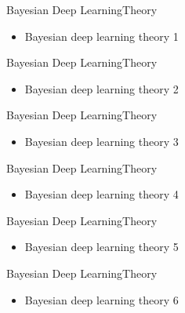 \documentclass[AERbeamer%
              ,optEnglish%
              ,optBiber%
              ,optBibstyleAlphabetic%
              ,optBeamerClassicFormat%
              ]{AERlatex}%
\begin{document}
\begin{frame}[c]{Bayesian Deep Learning}{Theory}
    \centering
    \begin{itemize}
        \item Bayesian deep learning theory 1
    \end{itemize}
\end{frame}


\begin{frame}[c]{Bayesian Deep Learning}{Theory}
    \centering
    \begin{itemize}
        \item Bayesian deep learning theory 2
    \end{itemize}
\end{frame}


\begin{frame}[c]{Bayesian Deep Learning}{Theory}
    \centering
    \begin{itemize}
        \item Bayesian deep learning theory 3
    \end{itemize}
\end{frame}


\begin{frame}[c]{Bayesian Deep Learning}{Theory}
    \centering
    \begin{itemize}
        \item Bayesian deep learning theory 4
    \end{itemize}
\end{frame}


\begin{frame}[c]{Bayesian Deep Learning}{Theory}
    \centering
    \begin{itemize}
        \item Bayesian deep learning theory 5
    \end{itemize}
\end{frame}


\begin{frame}[c]{Bayesian Deep Learning}{Theory}
    \centering
    \begin{itemize}
        \item Bayesian deep learning theory 6
    \end{itemize}
\end{frame}
\end{document}

